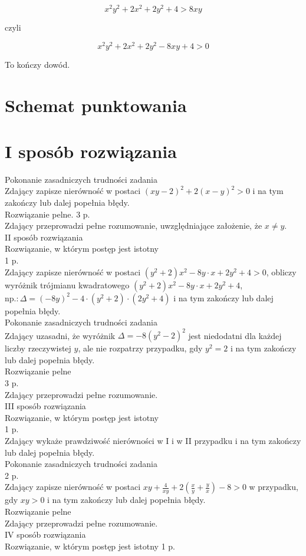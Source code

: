 \documentclass[10pt]{article}
\begin{document}
$$
x^{2} y^{2}+2 x^{2}+2 y^{2}+4>8 x y
$$

czyli

$$
x^{2} y^{2}+2 x^{2}+2 y^{2}-8 x y+4>0
$$

To kończy dowód.

\section*{Schemat punktowania}
\section*{I sposób rozwiązania}
Pokonanie zasadniczych trudności zadania\\
Zdający zapisze nierówność w postaci $(x y-2)^{2}+2(x-y)^{2}>0$ i na tym zakończy lub dalej popełnia błędy.\\
Rozwiązanie pelne. 3 p.\\
Zdający przeprowadzi pełne rozumowanie, uwzględniające założenie, że $x \neq y$.\\
II sposób rozwiązania\\
Rozwiązanie, w którym postęp jest istotny\\
1 p.\\
Zdający zapisze nierówność w postaci $\left(y^{2}+2\right) x^{2}-8 y \cdot x+2 y^{2}+4>0$, obliczy wyróżnik trójmianu kwadratowego $\left(y^{2}+2\right) x^{2}-8 y \cdot x+2 y^{2}+4$, $\mathrm{np} .: \Delta=(-8 y)^{2}-4 \cdot\left(y^{2}+2\right) \cdot\left(2 y^{2}+4\right)$ i na tym zakończy lub dalej popełnia błędy.\\
Pokonanie zasadniczych trudności zadania\\
Zdający uzasadni, że wyróżnik $\Delta=-8\left(y^{2}-2\right)^{2}$ jest niedodatni dla każdej liczby rzeczywistej $y$, ale nie rozpatrzy przypadku, gdy $y^{2}=2$ i na tym zakończy lub dalej popełnia błędy.\\
Rozwiązanie pelne\\
3 p.\\
Zdający przeprowadzi pełne rozumowanie.\\
III sposób rozwiązania\\
Rozwiązanie, w którym postęp jest istotny\\
1 p.\\
Zdający wykaże prawdziwość nierówności w I i w II przypadku i na tym zakończy lub dalej popełnia błędy.\\
Pokonanie zasadniczych trudności zadania\\
2 p.\\
Zdający zapisze nierówność w postaci $x y+\frac{4}{x y}+2\left(\frac{x}{y}+\frac{y}{x}\right)-8>0$ w przypadku, gdy $x y>0$ i na tym zakończy lub dalej popełnia błędy.\\
Rozwiązanie pelne\\
Zdający przeprowadzi pełne rozumowanie.\\
IV sposób rozwiązania\\
Rozwiązanie, w którym postęp jest istotny 1 p.
\end{document}
